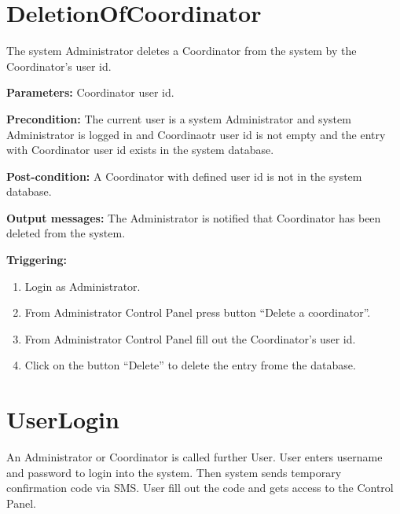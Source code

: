 \section{DeletionOfCoordinator}
\label{operation:DeletionOfCoordinator}
The system Administrator deletes a Coordinator from the system by the Coordinator's user id.

\begin{description}

\item \textbf{Parameters:} Coordinator user id.
\item \textbf{Precondition:} The current user is a system Administrator and
system Administrator is logged in and Coordinaotr user id is not empty and the entry with Coordinator user id exists
in the system database.
\item \textbf{Post-condition:} A Coordinator with defined user id is not in the
system database.
\item \textbf{Output messages:} The Administrator is notified that Coordinator
has been deleted from the system.

\item \textbf{Triggering:}
\begin{enumerate}
\item Login as Administrator.
\item From Administrator Control Panel press button ``Delete a coordinator''.
\item From Administrator Control Panel fill out the Coordinator's user id.
\item Click on the button ``Delete'' to delete the entry frome the database.
\end{enumerate}
 
\end{description}


\section{UserLogin}
\label{operation:UserLogin}
An Administrator or Coordinator is called further User. User enters username and
password to login into the system. Then system sends temporary confirmation code
via SMS. User fill out the code and gets access to the Control Panel.

